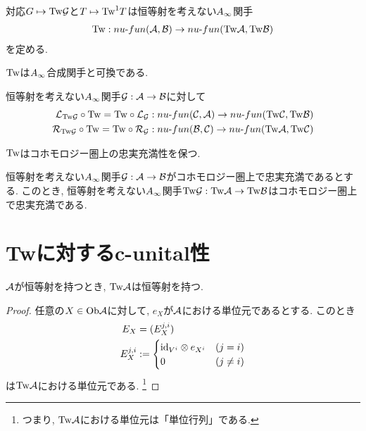 \documentclass[uplatex, a4paper, 14Q, dvipdfmx]{jsarticle}
\begin{document}
\begin{lemma}
  対応$G \mapsto \mathrm{Tw}\mathcal{G}$と$T \mapsto \mathrm{Tw}^1T$は恒等射を考えない$A_{\infty}$関手 
  \begin{align*}
    \mathrm{Tw} : nu \text{-} fun (\mathcal{A}, \mathcal{B}) \to nu \text{-} fun (\mathrm{Tw}\mathcal{A}, \mathrm{Tw}\mathcal{B})
  \end{align*}
  を定める. 
\end{lemma}

$\mathrm{Tw}$は$A_{\infty}$合成関手と可換である.

\begin{lemma} \label{prop_Tw_is_commutative_with_comp_func}
  恒等射を考えない$A_{\infty}$関手$\mathcal{G} : \mathcal{A} \to \mathcal{B}$に対して
  \begin{align*}
    \mathcal{L}_{\mathrm{Tw}\mathcal{G}} \circ \mathrm{Tw} = \mathrm{Tw} \circ \mathcal{L}_{\mathcal{G}} : nu \text{-} fun (\mathcal{C}, \mathcal{A}) \to nu \text{-} fun (\mathrm{Tw}\mathcal{C}, \mathrm{Tw}\mathcal{B}) \\
    \mathcal{R}_{\mathrm{Tw}\mathcal{G}} \circ \mathrm{Tw} = \mathrm{Tw} \circ \mathcal{R}_{\mathcal{G}} : nu \text{-} fun (\mathcal{B}, \mathcal{C}) \to nu \text{-} fun (\mathrm{Tw}\mathcal{A}, \mathrm{Tw}\mathcal{C})
  \end{align*}
\end{lemma}

$\mathrm{Tw}$はコホモロジー圏上の忠実充満性を保つ.

\begin{lemma} \label{prop_TwG_is_also_cohomologically_fully_faithful}
  恒等射を考えない$A_{\infty}$関手$\mathcal{G} : \mathcal{A} \to \mathcal{B}$がコホモロジー圏上で忠実充満であるとする. 
  このとき, 恒等射を考えない$A_{\infty}$関手$\mathrm{Tw}\mathcal{G} : \mathrm{Tw}\mathcal{A} \to \mathrm{Tw}\mathcal{B}$はコホモロジー圏上で忠実充満である.
\end{lemma}

\section{Twに対するc-unital性}

\begin{lemma} \label{prop_TwA_is_also_unital}
  $\mathcal{A}$が恒等射を持つとき, $\mathrm{Tw}\mathcal{A}$は恒等射を持つ.
\end{lemma}

\begin{proof}
  任意の$X \in \mathrm{Ob}\mathcal{A}$に対して, $e_X$が$\mathcal{A}$における単位元であるとする. 
  このとき
  \begin{align*}
    E_X &= (E_X^{j,i}) \\
    E_X^{j,i} &:= 
    \begin{cases}
      \mathrm{id}_{V^i} \otimes e_{X^i} & (j=i) \\
      0 & (j \neq i)  
    \end{cases}
  \end{align*}
  は$\mathrm{Tw}\mathcal{A}$における単位元である. 
  \footnote{
    つまり, $\mathrm{Tw}\mathcal{A}$における単位元は「単位行列」である.
  }
\end{proof}
\end{document}
